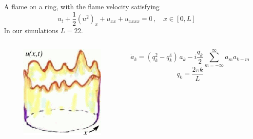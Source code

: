 \documentclass[mathserif, handout]{beamer}
\begin{document}
\begin{frame}
  \frametitle{\small\KSe~ \\{\color{yellow}\cite{ku, michsiv77}}}
  A flame on a ring, with the flame velocity satisfying
  \[
  u_t+\frac{1}{2}(u^2)_x+u_{xx}+u_{xxxx}=0\,,\quad x\in [0,L]
  \]
  In our simulations $L=22$.
  \begin{columns}[c]
    \begin{figure}[h]
    \centering
    \includegraphics[width=1\textwidth]{flameFlut}
  \end{figure}
  
  \[
  \dot{a}_k  =
  ( q_k^2 - q_k^4 )\, a_k
  - i \frac{q_k}{2} \sum_{m=-\infty}^{\infty} a_m a_{k-m}
  \]
  \[
  q_k = \frac{2\pi k}{L}
  \]
  \end{columns}
 



\end{frame}
\end{document}
